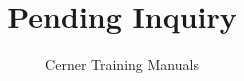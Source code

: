 

\title{Pending Inquiry} %
\author{Cerner Training Manuals}


    \frontmatter
        \maketitle %
        \begin{fullwidth}
            \tableofcontents
        \end{fullwidth}

    \mainmatter
        

    \backmatter


